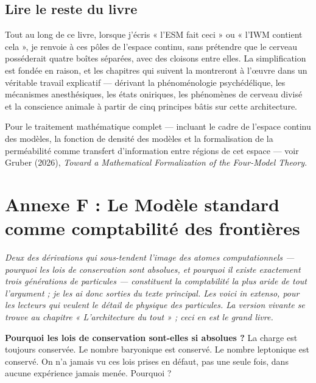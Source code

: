 \documentclass[11pt, twoside, openright]{book}
\begin{document}
\section*{Lire le reste du livre}

Tout au long de ce livre, lorsque j'écris « l'ESM fait ceci » ou « l'IWM contient cela », je renvoie à ces pôles de l'espace continu, sans prétendre que le cerveau posséderait quatre boîtes séparées, avec des cloisons entre elles. La simplification est fondée en raison, et les chapitres qui suivent la montreront à l'œuvre dans un véritable travail explicatif --- dérivant la phénoménologie psychédélique, les mécanismes anesthésiques, les états oniriques, les phénomènes de cerveau divisé et la conscience animale à partir de cinq principes bâtis sur cette architecture.

Pour le traitement mathématique complet --- incluant le cadre de l'espace continu des modèles, la fonction de densité des modèles et la formalisation de la perméabilité comme transfert d'information entre régions de cet espace --- voir Gruber (2026), \textit{Toward a Mathematical Formalization of the Four-Model Theory}.


\chapter*{Annexe F : Le Modèle standard comme comptabilité des frontières}

\textit{Deux des dérivations qui sous-tendent l'image des atomes computationnels --- pourquoi les lois de conservation sont absolues, et pourquoi il existe exactement trois générations de particules --- constituent la comptabilité la plus aride de tout l'argument ; je les ai donc sorties du texte principal. Les voici in extenso, pour les lecteurs qui veulent le détail de physique des particules. La version vivante se trouve au chapitre « L'architecture du tout » ; ceci en est le grand livre.}

\textbf{Pourquoi les lois de conservation sont-elles si absolues ?} La charge est toujours conservée. Le nombre baryonique est conservé. Le nombre leptonique est conservé. On n'a jamais vu ces lois prises en défaut, pas une seule fois, dans aucune expérience jamais menée. Pourquoi ?
\end{document}
